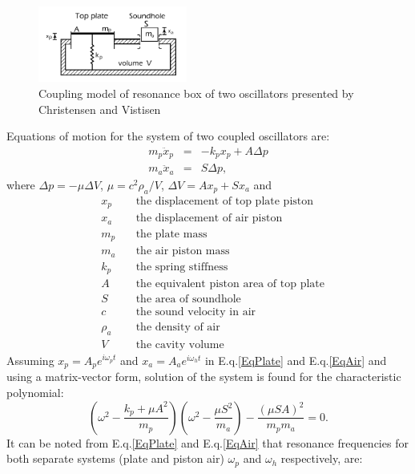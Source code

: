 \begin{figure}[h]
\centering
\includegraphics[height=2.5cm]{img/Top-Air.png}
\caption{Coupling model of resonance box of two oscillators presented by Christensen and Vistisen}
\label{Top-Air}
\end{figure}


Equations of motion for the system of two coupled oscillators are:
\begin{eqnarray}
m_{p}\ddot{x}_p & = & - k_p x_p  + A \Delta p
\label{EqPlate}\\
m_{a}\ddot{x}_a & = & S \Delta p,
\label{EqAir}
\end{eqnarray}
where $\Delta p  = - \mu \Delta V$, $\mu= c^2 \rho_a / V$, $\Delta V  =  A x_p + S x_a$ and
\begin{eqnarray*}
& x_p \quad  &\text{the displacement of top plate piston}\\
& x_a \quad &\text{the displacement of air piston}\\
& m_p \quad &\text{the plate mass}\\
& m_a \quad &\text{the air piston mass}\\
& k_p \quad &\text{the spring stiffness}\\
& A \quad &\text{the equivalent piston area of top plate}\\
& S \quad &\text{the area of soundhole}\\
& c \quad &\text{the sound velocity in air}\\
& \rho_a \quad &\text{the density of air}\\
& V \quad &\text{the cavity volume}
\end{eqnarray*}
Assuming $x_p=A_p e^{i\omega_p t}$ and $x_a=A_a e^{i\omega_h t}$ in E.q.\ref{EqPlate} and E.q.\ref{EqAir} and using a matrix-vector form, solution of the system is found for the characteristic polynomial:
\begin{equation}
\left( \omega^2 - \frac{k_p + \mu A^2}{m_p} \right) \left( \omega^2 - \frac{\mu S^2}{m_a} \right) - \frac{(\mu SA)^2}{m_p m_a} =0.
\label{2Poly}
\end{equation}
It can be noted from E.q.\ref{EqPlate} and E.q.\ref{EqAir} that resonance frequencies for both separate systems (plate and piston air) $\omega_p$ and $\omega_h$ respectively, are:
